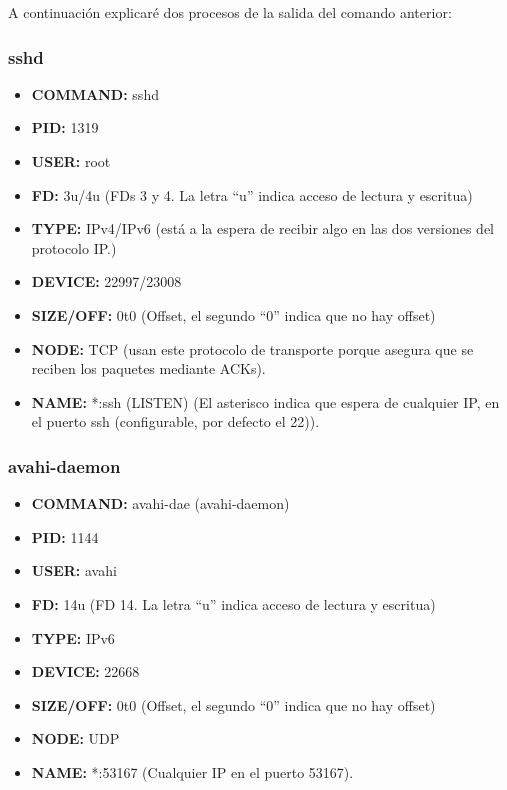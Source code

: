 \documentclass{article}
\begin{document}
A continuación explicaré dos procesos de la salida del comando anterior:

\subsubsection*{sshd}
\begin{itemize}
    \item \textbf{COMMAND: }sshd
    \item \textbf{PID: }1319
    \item \textbf{USER: }root
    \item \textbf{FD: }3u/4u (FDs 3 y 4. La letra ``u'' indica acceso de lectura y escritua)
    \item \textbf{TYPE: }IPv4/IPv6 (está a la espera de recibir algo en las dos versiones del protocolo IP.)
    \item \textbf{DEVICE: }22997/23008
    \item \textbf{SIZE/OFF: }0t0 (Offset, el segundo ``0'' indica que no hay offset)
    \item \textbf{NODE: }TCP (usan este protocolo de transporte porque asegura que se reciben los paquetes mediante ACKs).
    \item \textbf{NAME: }*:ssh (LISTEN) (El asterisco indica que espera de cualquier IP, en el puerto ssh (configurable, por defecto el 22)).
\end{itemize}

\subsubsection*{avahi-daemon}
\begin{itemize}
    \item \textbf{COMMAND: }avahi-dae (avahi-daemon)
    \item \textbf{PID: }1144
    \item \textbf{USER: }avahi
    \item \textbf{FD: }14u (FD 14. La letra ``u'' indica acceso de lectura y escritua)
    \item \textbf{TYPE: }IPv6
    \item \textbf{DEVICE: }22668
    \item \textbf{SIZE/OFF: }0t0 (Offset, el segundo ``0'' indica que no hay offset)
    \item \textbf{NODE: }UDP
    \item \textbf{NAME: }*:53167 (Cualquier IP en el puerto 53167).
\end{itemize}
\end{document}
